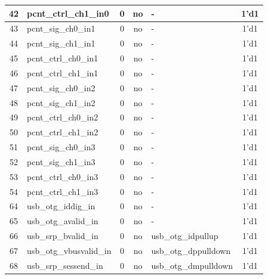 \begin{longtable}[c]{|c|l|c|c|l|c|}
 42  &     pcnt\_ctrl\_ch1\_in0  &  0  &   no  &                       -  &               1'd1  \\\hline
 43  &      pcnt\_sig\_ch0\_in1  &  0  &   no  &                       -  &               1'd1  \\\hline
 44  &      pcnt\_sig\_ch1\_in1  &  0  &   no  &                       -  &               1'd1  \\\hline
 45  &     pcnt\_ctrl\_ch0\_in1  &  0  &   no  &                       -  &               1'd1  \\\hline
 46  &     pcnt\_ctrl\_ch1\_in1  &  0  &   no  &                       -  &               1'd1  \\\hline
 47  &      pcnt\_sig\_ch0\_in2  &  0  &   no  &                       -  &               1'd1  \\\hline
 48  &      pcnt\_sig\_ch1\_in2  &  0  &   no  &                       -  &               1'd1  \\\hline
 49  &     pcnt\_ctrl\_ch0\_in2  &  0  &   no  &                       -  &               1'd1  \\\hline
 50  &     pcnt\_ctrl\_ch1\_in2  &  0  &   no  &                       -  &               1'd1  \\\hline
 51  &      pcnt\_sig\_ch0\_in3  &  0  &   no  &                       -  &               1'd1  \\\hline
 52  &      pcnt\_sig\_ch1\_in3  &  0  &   no  &                       -  &               1'd1  \\\hline
 53  &     pcnt\_ctrl\_ch0\_in3  &  0  &   no  &                       -  &               1'd1  \\\hline
 54  &     pcnt\_ctrl\_ch1\_in3  &  0  &   no  &                       -  &               1'd1  \\\hline
 64  &      usb\_otg\_iddig\_in  &  0  &   no  &                       -  &               1'd1  \\\hline
 65  &     usb\_otg\_avalid\_in  &  0  &   no  &                       -  &               1'd1  \\\hline
 66  &     usb\_srp\_bvalid\_in  &  0  &   no  &      usb\_otg\_idpullup  &               1'd1  \\\hline
 67  &  usb\_otg\_vbusvalid\_in  &  0  &   no  &    usb\_otg\_dppulldown  &               1'd1  \\\hline
 68  &    usb\_srp\_sessend\_in  &  0  &   no  &    usb\_otg\_dmpulldown  &               1'd1  \\\hline

\end{longtable}
